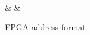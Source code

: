 \begin{figure}[h]
	\centering
	\begin{bytefield}[endianness=big,bitwidth=0.04\linewidth]{23}
		\\
		 &
		 &
	\end{bytefield}
	\caption{FPGA address format}
	\label{fig:ebi_addresses}
\end{figure}


